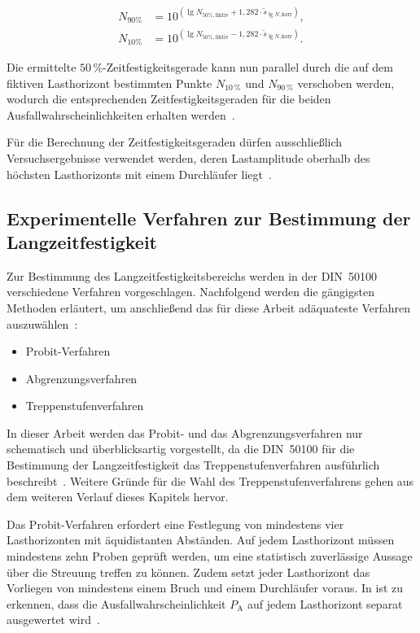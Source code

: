 \begin{subequations}
\begin{align}
N_{90\%} &= 10^{\left( \lg N_{50\%,\text{fiktiv}} + 1{,}282 \cdot \tilde{s}_{\lg N,\text{korr}} \right)} \label{eq:N90}, \\[1ex]
N_{10\%} &= 10^{\left( \lg N_{50\%,\text{fiktiv}} - 1{,}282 \cdot \tilde{s}_{\lg N,\text{korr}} \right)} \label{eq:N10}.
\end{align}
\end{subequations}

Die ermittelte \(50\,\%\)-Zeitfestigkeitsgerade kann nun parallel durch die auf dem fiktiven Lasthorizont bestimmten Punkte \(N_{10\,\%}\) und \(N_{90\,\%}\) verschoben werden, wodurch die entsprechenden Zeitfestigkeitsgeraden für die beiden Ausfallwahrscheinlichkeiten erhalten werden~\cite[Seite~57]{DIN50100}.

Für die Berechnung der Zeitfestigkeitsgeraden dürfen ausschließlich Versuchsergebnisse verwendet werden, deren Lastamplitude oberhalb des höchsten Lasthorizonts mit einem Durchläufer liegt~\cite[Seite~54]{DIN50100}.

\clearpage

	\subsection{Experimentelle Verfahren zur Bestimmung der Langzeitfestigkeit}\label{chap:Theorie_Treppenstufenverfahren}
	Zur Bestimmung des Langzeitfestigkeitsbereichs werden in der DIN~50100 verschiedene Verfahren vorgeschlagen. Nachfolgend werden die gängigsten Methoden erläutert, um anschließend das für diese Arbeit adäquateste Verfahren auszuwählen~\cite[Seite 45]{DIN50100}:
	\begin{itemize}
    \item Probit-Verfahren
    \item Abgrenzungsverfahren
    \item Treppenstufenverfahren 
	\end{itemize}

In dieser Arbeit werden das Probit- und das Abgrenzungsverfahren nur schematisch und überblicksartig vorgestellt, da die DIN~50100 für die Bestimmung der Langzeitfestigkeit das Treppenstufenverfahren ausführlich beschreibt~\cite[Seite~45--49]{DIN50100}. Weitere Gründe für die Wahl des Treppenstufenverfahrens gehen aus dem weiteren Verlauf dieses Kapitels hervor.

Das Probit-Verfahren erfordert eine Festlegung von mindestens vier Lasthorizonten mit äquidistanten Abständen. Auf jedem Lasthorizont müssen mindestens zehn Proben geprüft werden, um eine statistisch zuverlässige Aussage über die Streuung treffen zu können. Zudem setzt jeder Lasthorizont das Vorliegen von mindestens einem Bruch und einem Durchläufer voraus.
In  ist zu erkennen, dass die Ausfallwahrscheinlichkeit $P_{\text{A}}$  auf jedem Lasthorizont separat ausgewertet wird~\cite[Seite~36]{Dissertation_Woehler}.  

